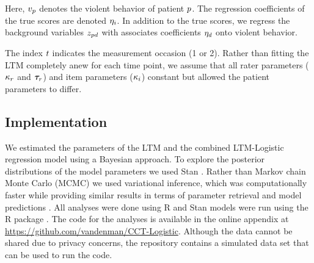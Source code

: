 \documentclass[a4paper,11pt]{article}
\newcommand{\githuburl}{\url{https://github.com/vandenman/CCT-Logistic}}
\begin{document}
Here, $v_{p}$ denotes the violent behavior of patient $p$.
The regression coefficients of the true scores are denoted $\eta_{i}$.
In addition to the true scores, we regress the background variables $z_{pd}$ with associates coefficients $\eta_{d}$ onto violent behavior.

The index $t$ indicates the measurement occasion (1 or 2).
Rather than fitting the LTM completely anew for each time point, we assume that all rater parameters ($\kappa_r$ and $\bm{\tau}_{r}$) and item parameters ($\kappa_i$) constant but allowed the patient parameters to differ.

\subsection{Implementation}
We estimated the parameters of the LTM and the combined LTM-Logistic regression model using a Bayesian approach.
To explore the posterior distributions of the model parameters we used Stan \parencite{CarpenterEtAl2017Stan}.
Rather than Markov chain Monte Carlo (MCMC) we used variational inference, which was computationally faster while providing similar results in terms of parameter retrieval and model predictions \parencite{kucukelbir2017automatic}.
All analyses were done using R \parencite{R} and Stan models were run using the R package  \parencite{cmdstanr}.
The code for the analyses is available in the online appendix at \githuburl{}.
Although the data cannot be shared due to privacy concerns, the repository contains a simulated data set that can be used to run the code.




\end{document}
